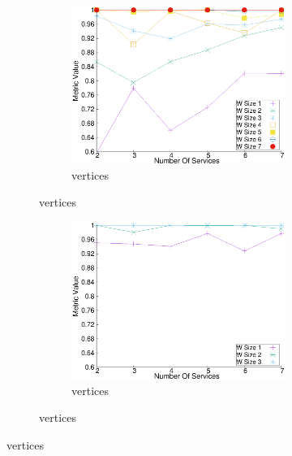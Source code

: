 \begin{figure}[H]
\begin{adjustbox}{minipage=\linewidth,scale=0.75}
\begin{subfigure}{0.45\textwidth}
    \begin{subfigure}{\textwidth}
      \includegraphics[width=\textwidth]{Images/graphs/window_quality_performance_diff_perce_n7_s7_20_100_n7}
      \caption{ vertices}
      \label{fig:quality_window_wide_perce_n7}
    \end{subfigure}
  \end{subfigure}
  \begin{subfigure}{0.45\textwidth}
    \begin{subfigure}{\textwidth}
      \includegraphics[width=\textwidth]{Images/graphs/window_quality_performance_diff_perce_n7_s7_50_89_n3}
      \caption{ vertices}
  
      \label{fig:quality_window_average_perce_n3}
    \end{subfigure}
  

\end{subfigure}
\end{adjustbox}
\end{figure}
